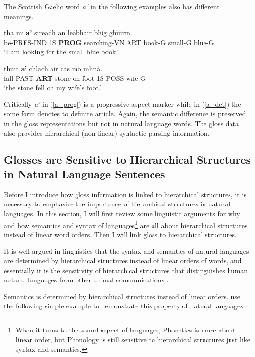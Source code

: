 \documentclass[final]{ua-thesis}
\begin{document}
The Scottish Gaelic word \textit{a'} in the following examples also has different meanings.  

\begin{exe}  
\ex \label{a_prog}
\gll tha mi \textbf{a'} sireadh an leabhair bhig ghuirm.\\
be-PRES-IND 1S \textbf{PROG} searching-VN ART book-G small-G blue-G\\
\glt `I am looking for the small blue book.' \citep[p. 29]{lamb2001scottish}

\ex \label{a_det}
\gll thuit \textbf{a'} chlach air cas mo mhn\`a.\\
fall-PAST \textbf{ART} stone on foot 1S-POSS wife-G\\
\glt`the stone fell on my wife's foot.' \citep[p. 30]{lamb2001scottish} 	
\end{exe}

Critically \textit{a'} in (\ref{a_prog}) is a progressive aspect marker while in (\ref{a_det}) the some form denotes to definite article. Again, the semantic difference is preserved in the gloss representations but not in natural language words.  
The gloss data also provides hierarchical (non-linear) syntactic parsing information. 

\subsection{Glosses are Sensitive to Hierarchical Structures in Natural Language Sentences}

Before I introduce how gloss information is linked to hierarchical structures, it is necessary to emphasize the importance of hierarchical structures in natural languages. In this section, I will first review some linguistic arguments for why and how semantics and syntax of languages\footnote{When it turns to the sound aspect of languages, Phonetics is more about linear order, but Phonology is still sensitive to hierarchical structures just like syntax and semantics. } are all about hierarchical structures instead of linear word orders. Then I will link gloss to hierarchical structures.

It is well-argued in linguistics that the syntax and semantics of natural languages are determined by hierarchical structures instead of linear orders of words, and essentially it is the sensitivity of hierarchical structures that distinguishes human natural languages from other animal communications \citep{berwick2015only}.     

Semantics is determined by hierarchical structures instead of linear orders. \citet[p. 117]{berwick2015only} use the following simple example to demonstrate this property of natural languages:
\end{document}
